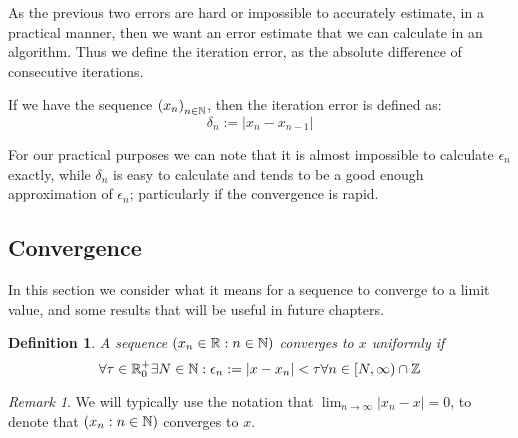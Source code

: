 As the previous two errors are hard or impossible to accurately estimate, in a practical manner, then we want an error estimate that we can calculate in an algorithm. Thus we define the iteration error, as the absolute difference of consecutive iterations.

\begin{Iteration Error}
\label{DEF_"Iteration Error"}
If we have the sequence \(\left(x_n\right)_{n \in \mathbb{N}}\), then the iteration error is defined as:
\[ \delta_n := \left|x_n - x_{n-1}\right| \]
\end{Iteration Error}

For our practical purposes we can note that it is almost impossible to calculate \(\epsilon_n\) exactly, while \(\delta_n\) is easy to calculate and tends to be a good enough approximation of \(\epsilon_n\); particularly if the convergence is rapid.\\ 

\subsection{Convergence}
\label{SEC_"Convergence"}

\newtheorem{Uniform Convergence}{Definition}[subsection]
\newtheorem{Rate of Convergence}[Uniform Convergence]{Definition}

\theoremstyle{remark}
\newtheorem{Uniform Convergence R1}{Remark}[Uniform Convergence]

\theoremstyle{plain}
\newtheorem{Uniform Convergence Thm}{Theorem}[subsection]
\newtheorem{Quad Convergence of Newton}[Uniform Convergence Thm]{Theorem}

In this section we consider what it means for a sequence to converge to a limit value, and some results that will be useful in future chapters.

\begin{Uniform Convergence}
\label{DEF_"Uniform Convergence"}
A sequence \((x_n \in \mathbb{R}: n \in \mathbb{N})\) converges to \(x\) uniformly if \[\forall \tau \in \mathbb{R}^+_0 \exists N \in \mathbb{N} : \epsilon_n := |x - x_n| < \tau \forall n \in [N, \infty) \cap \mathbb{Z}\]
\end{Uniform Convergence}

\begin{Uniform Convergence R1}
\label{RMK_"Uniform Convergence R1"}
We will typically use the notation that \(\lim_{n \to \infty} |x_n - x| = 0\), to denote that \((x_n : n \in \mathbb{N})\) converges to \(x\).
\end{Uniform Convergence R1}

